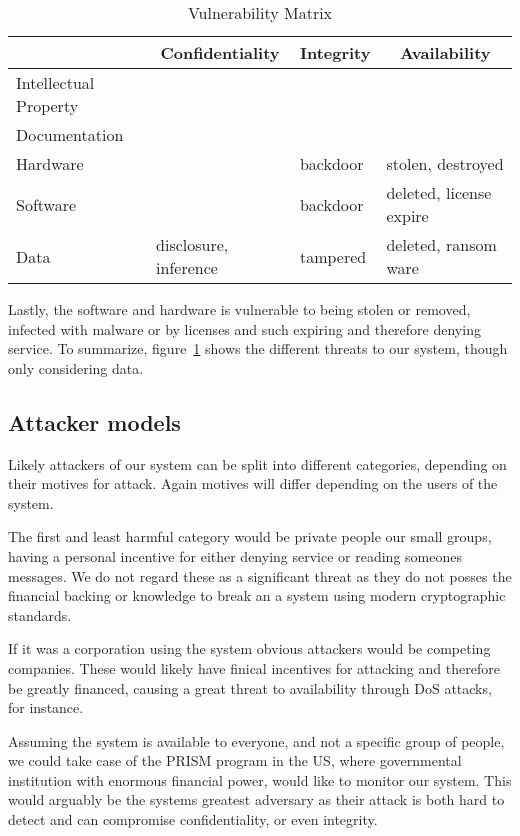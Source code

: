 \begin{table}[h!]
  \centering
  \begin{tabular}{l|l|l|l}
    \multicolumn{1}{c|}{} & \multicolumn{1}{c|}{\textbf{Confidentiality}} & \multicolumn{1}{c|}{\textbf{Integrity}} & \multicolumn{1}{c}{\textbf{Availability}} \\ \hline
    Intellectual Property &  & & \\ \hline
    Documentation & & & \\ \hline
    Hardware & & backdoor & stolen, destroyed \\ \hline
    Software & & backdoor & deleted, license expire \\ \hline
    Data & disclosure, inference & tampered & deleted, ransom ware
  \end{tabular}
  \caption{\label{tbl:vuln-matrix} Vulnerability Matrix}
\end{table}

Lastly, the software and hardware is vulnerable to being stolen or
removed, infected with malware or by licenses and such expiring and
therefore denying service. To summarize, figure~\ref{tbl:vuln-matrix}
shows the different threats to our system, though only considering
data.


\subsection{Attacker models}

Likely attackers of our system can be split into different
categories, depending on their motives for attack. Again motives will
differ depending on the users of the system.

The first and least harmful category would be private people our small
groups, having a personal incentive for either denying service or
reading someones messages. We do not regard these as a significant
threat as they do not posses the financial backing or knowledge to
break an a system using modern cryptographic standards.

If it was a corporation using the system obvious attackers would be
competing companies. These would likely have finical incentives for
attacking and therefore be greatly financed, causing a great threat to
availability through DoS attacks, for instance.

Assuming the system is available to everyone, and not a specific group
of people, we could take case of the PRISM program in the US, where
governmental institution with enormous financial power, would like to
monitor our system. This would arguably be the systems greatest
adversary as their attack is both hard to detect and can compromise
confidentiality, or even integrity.



